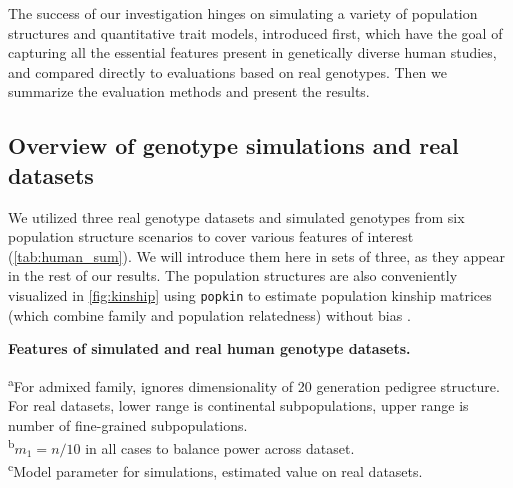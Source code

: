 \documentclass[11pt]{article}
\begin{document}
The success of our investigation hinges on simulating a variety of population structures and quantitative trait models, introduced first, which have the goal of capturing all the essential features present in genetically diverse human studies, and compared directly to evaluations based on real genotypes.
Then we summarize the evaluation methods and present the results.

\subsection{Overview of genotype simulations and real datasets}

We utilized three real genotype datasets and simulated genotypes from six population structure scenarios to cover various features of interest (\cref{tab:human_sum}).
We will introduce them here in sets of three, as they appear in the rest of our results.
The population structures are also conveniently visualized in \cref{fig:kinship} using \texttt{popkin} to estimate population kinship matrices (which combine family and population relatedness) without bias \citep{ochoa_estimating_2021}.

\begin{table}[hb!]
  \centering
  \footnotesize
  \caption{
    \textbf{Features of simulated and real human genotype datasets.}
  }
  \label{tab:human_sum}
  \begin{flushleft} 
    \textsuperscript{a}For admixed family, ignores dimensionality of 20 generation pedigree structure.
    For real datasets, lower range is continental subpopulations, upper range is number of fine-grained subpopulations.\\
    \textsuperscript{b}$m_1 = n / 10$ in all cases to balance power across dataset.\\
    \textsuperscript{c}Model parameter for simulations, estimated value on real datasets.
  \end{flushleft}
\end{table}
\end{document}
